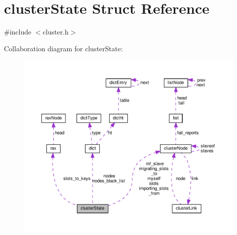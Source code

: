 \hypertarget{structcluster_state}{}\section{cluster\+State Struct Reference}
\label{structcluster_state}


{\ttfamily \#include $<$cluster.\+h$>$}



Collaboration diagram for cluster\+State\+:
\nopagebreak
\begin{figure}[H]
\begin{center}
\leavevmode
\includegraphics[width=350pt]{structcluster_state__coll__graph}
\end{center}
\end{figure}
